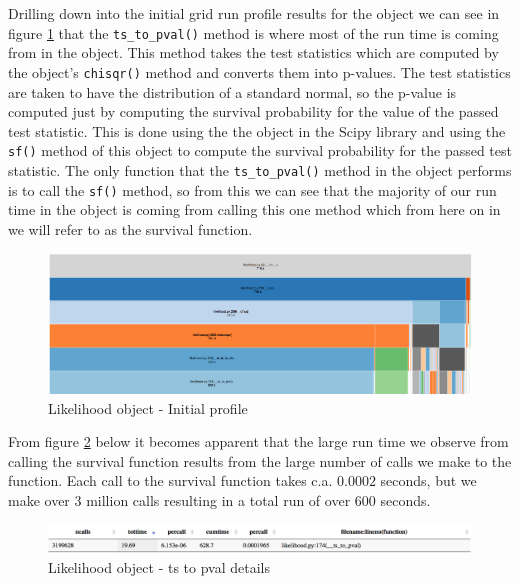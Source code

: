 Drilling down into the initial grid run profile results for the  object we can see in figure \ref{fig:like_initial_profile} that the \texttt{ts\_to\_pval()} method is where most of the run time is coming from in the  object. This method takes the test statistics which are computed by the  object's \texttt{chisqr()} method and converts them into p-values. The test statistics are taken to have the distribution of a standard normal, so the p-value is computed just by computing the survival probability for the value of the passed test statistic. This is done using the the  object in the Scipy library and using the \texttt{sf()} method of this object to compute the survival probability for the passed test statistic. The only function that the \texttt{ts\_to\_pval()} method in the  object performs is to call the \texttt{sf()} method, so from this we can see that the majority of our run time in the  object is coming from calling this one method which from here on in we will refer to as the survival function.

\begin{figure}[H]
\centering
\includegraphics[scale=0.23]{plots/likelihood_drill_down.png}
\caption{Likelihood object - Initial profile}
\label{fig:like_initial_profile}
\end{figure}

From figure \ref{fig:ts_to_pval} below it becomes apparent that the large run time we observe from calling the survival function results from the large number of calls we make to the function. Each call to the survival function takes c.a. $0.0002$ seconds, but we make over $3$ million calls resulting in a total run of over $600$ seconds. 

\begin{figure}[H]
\centering
\includegraphics[scale=0.3]{plots/likelihood_count.png}
\caption{Likelihood object - ts to pval details}
\label{fig:ts_to_pval}
\end{figure}

